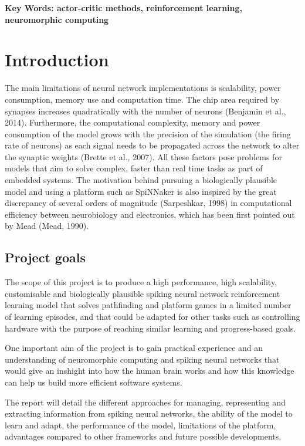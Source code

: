 \documentclass[10pt]{article}
\begin{document}
    \textbf{Key Words: actor-critic methods, reinforcement learning, neuromorphic computing}


    \tableofcontents
    \section{Introduction}
    
    The main limitations of neural network implementations is scalability, power consumption, memory use and computation time. The chip area required by synapses increases quadratically with the number of neurons (Benjamin et al., 2014). Furthermore, the computational complexity, memory and power consumption of the model grows with the precision of the simulation (the firing rate of neurons) as each signal needs to be propagated across the network to alter the synaptic weights (Brette et al., 2007). All these factors pose problems for models that aim to solve complex, faster than real time tasks as part of embedded systems. The motivation behind pursuing a biologically plausible model and using a platform such as SpiNNaker is also inspired by the great discrepancy of several orders of magnitude (Sarpeshkar, 1998) in computational efficiency between neurobiology and electronics, which has been first pointed out by Mead (Mead, 1990).

    \subsection{Project goals}

    The scope of this project is to produce a high performance, high scalability, customisable and biologically plausible spiking neural network reinforcement learning model that solves pathfinding and platform games in a limited number of learning episodes, and that could be adapted for other tasks such as controlling hardware with the purpose of reaching similar learning and progress-based goals.

    One important aim of the project is to gain practical experience and an understanding of neuromorphic computing and spiking neural networks that would give an inshight into how the human brain works and how this knowledge can help us build more efficient software systems.

    The report will detail the different approaches for managing, representing and extracting information from spiking neural networks, the ability of the model to learn and adapt, the performance of the model, limitations of the platform, advantages compared to other frameworks and future possible developments.
\end{document}

